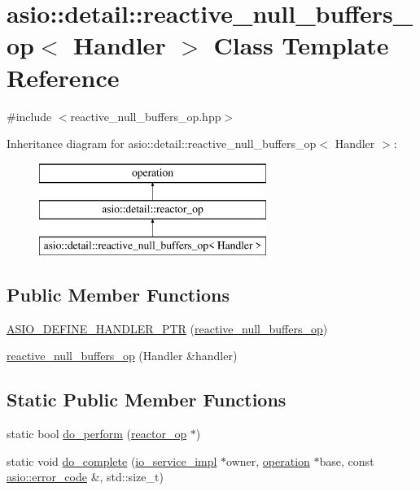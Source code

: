 \hypertarget{classasio_1_1detail_1_1reactive__null__buffers__op}{}\section{asio\+:\+:detail\+:\+:reactive\+\_\+null\+\_\+buffers\+\_\+op$<$ Handler $>$ Class Template Reference}
\label{classasio_1_1detail_1_1reactive__null__buffers__op}


{\ttfamily \#include $<$reactive\+\_\+null\+\_\+buffers\+\_\+op.\+hpp$>$}

Inheritance diagram for asio\+:\+:detail\+:\+:reactive\+\_\+null\+\_\+buffers\+\_\+op$<$ Handler $>$\+:\begin{figure}[H]
\begin{center}
\leavevmode
\includegraphics[height=3.000000cm]{classasio_1_1detail_1_1reactive__null__buffers__op}
\end{center}
\end{figure}
\subsection*{Public Member Functions}
\begin{DoxyCompactItemize}
\item 
\hyperlink{classasio_1_1detail_1_1reactive__null__buffers__op_abcaea729e879dadd35c4253a002c0836}{A\+S\+I\+O\+\_\+\+D\+E\+F\+I\+N\+E\+\_\+\+H\+A\+N\+D\+L\+E\+R\+\_\+\+P\+T\+R} (\hyperlink{classasio_1_1detail_1_1reactive__null__buffers__op}{reactive\+\_\+null\+\_\+buffers\+\_\+op})
\item 
\hyperlink{classasio_1_1detail_1_1reactive__null__buffers__op_a294ef6134f3073da196cbff42b28ea97}{reactive\+\_\+null\+\_\+buffers\+\_\+op} (Handler \&handler)
\end{DoxyCompactItemize}
\subsection*{Static Public Member Functions}
\begin{DoxyCompactItemize}
\item 
static bool \hyperlink{classasio_1_1detail_1_1reactive__null__buffers__op_a1ae16716e911d6409489dc0d4ac0af8a}{do\+\_\+perform} (\hyperlink{classasio_1_1detail_1_1reactor__op}{reactor\+\_\+op} $\ast$)
\item 
static void \hyperlink{classasio_1_1detail_1_1reactive__null__buffers__op_aa84f594f17e11b4e680cfe82928c0b72}{do\+\_\+complete} (\hyperlink{namespaceasio_1_1detail_a6d61d9b8e53c11288be549d82aec5a42}{io\+\_\+service\+\_\+impl} $\ast$owner, \hyperlink{namespaceasio_1_1detail_a338968609bec20e37145309f8f9ec936}{operation} $\ast$base, const \hyperlink{classasio_1_1error__code}{asio\+::error\+\_\+code} \&, std\+::size\+\_\+t)
\end{DoxyCompactItemize}
